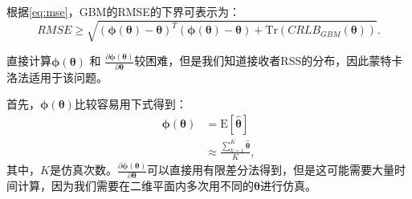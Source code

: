 根据\eqref{eq:mse}，GBM的RMSE的下界可表示为：
\begin{equation}
RMSE\! \ge\! \sqrt{{(\bm\phi(\bm{\theta})\! -\! \bm{\theta})}^T(\bm\phi(\bm{\theta})\! -\! \bm{\theta})\! +\! \mathrm{Tr}(CRLB_{GBM}(\bm{\theta}))}.\label{eq:rmse_gbm}
\end{equation}

直接计算$\bm\phi(\bm{\theta})$ 和 ${\frac{\partial\bm\phi(\bm{\theta})}{\partial \bm\theta}}$较困难，但是我们知道接收者RSS的分布，因此蒙特卡洛法适用于该问题。

首先，$\bm\phi(\bm{\theta})$比较容易用下式得到：
\begin{equation}
\begin{split}
\bm\phi(\bm{\theta}) &= \mathrm{E}[\widehat{\bm{\theta}}]\\
&\approx \frac{\sum\limits_{k = 1}^K{\widehat{\bm{\theta}}}}{K},
\end{split}
\end{equation}
其中，$K$是仿真次数。${\frac{\partial\bm\phi(\bm{\theta})}{\partial \bm\theta}}$可以直接用有限差分法得到，但是这可能需要大量时间计算，因为我们需要在二维平面内多次用不同的$\bm\theta$进行仿真。

